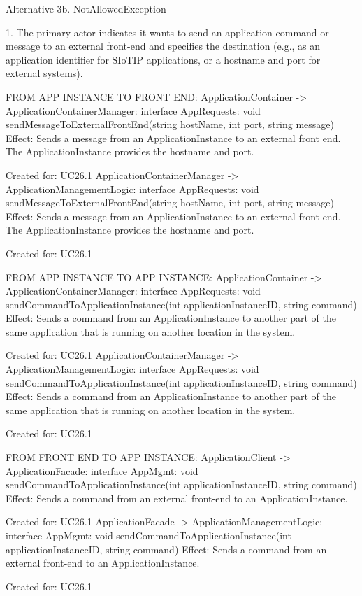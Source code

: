            Alternative 3b. NotAllowedException

            1. The primary actor indicates it wants to send an application command or message to an external
               front-end and specifies the destination (e.g., as an application identifier for SIoTIP applications,
               or a hostname and port for external systems).

                FROM APP INSTANCE TO FRONT END:
                     ApplicationContainer -> ApplicationContainerManager: interface AppRequests: void sendMessageToExternalFrontEnd(string hostName, int port, string message)
                        Effect: Sends a message from an ApplicationInstance to an external front end. The ApplicationInstance provides the hostname and port.
                        \item Created for: UC26.1
                     ApplicationContainerManager -> ApplicationManagementLogic: interface AppRequests: void sendMessageToExternalFrontEnd(string hostName, int port, string message)
                         Effect: Sends a message from an ApplicationInstance to an external front end. The ApplicationInstance provides the hostname and port.
                         \item Created for: UC26.1

                FROM APP INSTANCE TO APP INSTANCE:
                     ApplicationContainer -> ApplicationContainerManager: interface AppRequests: void sendCommandToApplicationInstance(int applicationInstanceID, string command)
                        Effect: Sends a command from an ApplicationInstance to another part of the same application that is running on another location in the system.
                        \item Created for: UC26.1
                     ApplicationContainerManager -> ApplicationManagementLogic: interface AppRequests: void sendCommandToApplicationInstance(int applicationInstanceID, string command)
                         Effect: Sends a command from an ApplicationInstance to another part of the same application that is running on another location in the system.
                         \item Created for: UC26.1

                FROM FRONT END TO APP INSTANCE:
                    ApplicationClient -> ApplicationFacade: interface AppMgmt: void sendCommandToApplicationInstance(int applicationInstanceID, string command)
                        Effect: Sends a command from an external front-end to an ApplicationInstance.
                        \item Created for: UC26.1
                    ApplicationFacade -> ApplicationManagementLogic: interface AppMgmt: void sendCommandToApplicationInstance(int applicationInstanceID, string command)
                        Effect: Sends a command from an external front-end to an ApplicationInstance.
                        \item Created for: UC26.1

